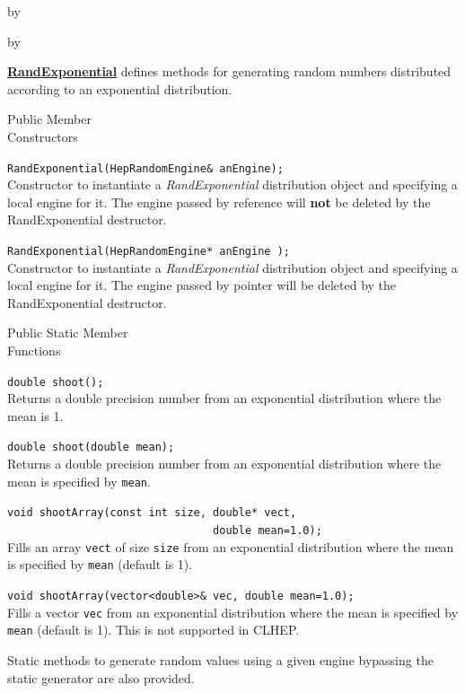 \documentclass[twoside]{article}
\newcommand{\comp}[1]{\texttt{#1}}%
\newcommand{\entrylabel}[1]{\mbox{\textbf{{#1}}}\hfil}%
\newenvironment{entry}
{\begin{list}{}%
    {\renewcommand{\makelabel}{\entrylabel}%
     \setlength{\labelwidth}{90pt}%
     \setlength{\leftmargin}{\labelwidth}
     \advance\leftmargin by \labelsep%
      }%
    }%
  {\end{list}}
\newcommand{\Entrylabel}[1]%
{\raisebox{0pt}[1ex][0pt]{\makebox[\labelwidth][l]%
    {\parbox[t]{\labelwidth}{\hspace{0pt}\textbf{{#1}}}}}}
\newenvironment{Entry}%
{\renewcommand{\entrylabel}{\Entrylabel}\begin{entry}}%
  {\end{entry}}
\begin{document}
\begin{description}
\begin{Entry}
\begin{Entry}
  \begin{description}
      \item \underline{\bf RandExponential}  defines methods for generating
        random numbers distributed according to an exponential distribution.
  \end{description}
      
\item[Public Member\\ Constructors]

   \verb+RandExponential(HepRandomEngine& anEngine);+\\
   Constructor to instantiate a {\em RandExponential}
   distribution object and specifying a local engine for it.
   The engine passed by reference will {\bf not} be deleted by
   the RandExponential destructor.
   
   \verb+RandExponential(HepRandomEngine* anEngine );+\\
   Constructor to instantiate a {\em RandExponential}
   distribution object and specifying a local engine for it.
   The engine passed by pointer will be deleted by the RandExponential
   destructor.

\item[Public Static Member\\ Functions]

   \verb+double shoot();+\\
   Returns a double precision number from an exponential distribution where the
   mean is 1.
  
   \verb+double shoot(double mean);+\\
   Returns a double precision number from an exponential distribution where the
   mean is specified by \comp{mean}.
  
   \verb+void shootArray(const int size, double* vect,+\\
   \verb+                                double mean=1.0);+\\
   Fills an array \comp{vect} of size \comp{size} from an exponential distribution
   where the mean is specified by \comp{mean} (default is 1).

   \verb+void shootArray(vector<double>& vec, double mean=1.0);+\\
   Fills a vector \comp{vec} from an exponential distribution
   where the mean is specified by \comp{mean} (default is 1).  This
   is not supported in CLHEP.
 
   Static methods to generate random values using a given engine
   bypassing the static generator are also provided.


\end{Entry}
\end{Entry}
\end{description}
\end{document}
